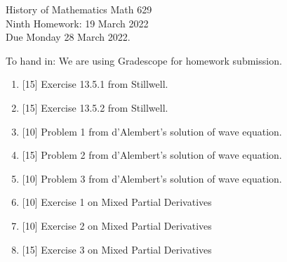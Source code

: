 \documentclass[12pt]{article}
\begin{document}
\LARGE 
\noindent
{\color{Maroon}History of Mathematics \hfill Math 629}\vspace{2pt}\\
\large
Ninth Homework: \hfill 19 March 2022\\
Due Monday 28 March 2022.
\normalsize\vspace{10pt}

To hand in: We are using Gradescope for homework submission.


\begin{enumerate}

\item  {[15]}
     Exercise 13.5.1 from Stillwell.

\item  {[15]}
     Exercise 13.5.2 from Stillwell.

\item  {[10]}
  Problem 1 from d'Alembert's solution of wave equation.
  
\item  {[15]}
     Problem 2 from d'Alembert's solution of wave equation.

\item  {[10]}
     Problem 3 from d'Alembert's solution of wave equation.

\item  {[10]}
       Exercise 1 on Mixed Partial Derivatives

\item  {[10]}
       Exercise 2 on Mixed Partial Derivatives

\item  {[15]}
       Exercise 3 on Mixed Partial Derivatives


 \end{enumerate}
\end{document}
